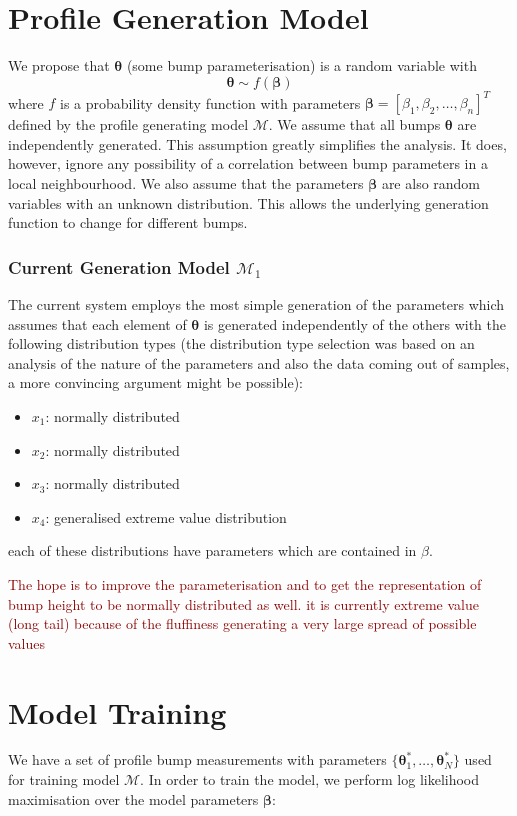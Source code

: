 \documentclass[12pt]{report}
\newcommand{\tcr}[1]{\textcolor{darkRed}{#1}}
\begin{document}
    \section{Profile Generation Model}
        We propose that $\pmb{\theta}$ (some bump parameterisation) is a random variable with
            \[ \pmb{\theta} \sim f(\pmb{\beta}) \]
        where $f$ is a probability density function with parameters $\pmb{\beta} = [\beta_1,\beta_2,\ldots,\beta_n]^T$ defined by the profile generating model $\mathcal{M}$.
        We assume that all bumps $\pmb{\theta}$ are independently generated. This assumption greatly simplifies the analysis. It does, however, ignore any possibility of a correlation between bump parameters in a local neighbourhood. We also assume that the parameters $\pmb{\beta}$ are also random variables with an unknown distribution. This allows the underlying generation function to change for different bumps.
        
        \subsubsection{Current Generation Model $\mathcal{M}_1$}
            The current system employs the most simple generation of the parameters which assumes that each element of $\pmb{\theta}$ is generated independently of the others with the following distribution types (the distribution type selection was based on an analysis of the nature of the parameters and also the data coming out of samples, a more convincing argument might be possible):
            \begin{itemize}
                \item $x_1$: normally distributed
                \item $x_2$: normally distributed
                \item $x_3$: normally distributed
                \item $x_4$: generalised extreme value distribution
            \end{itemize}
            each of these distributions have parameters which are contained in $\beta$.
            
            \tcr{The hope is to improve the parameterisation and to get the representation of bump height to be normally distributed as well. it is currently extreme value (long tail) because of the fluffiness generating a very large spread of possible values}
        
    \section{Model Training}
        We have a set of profile bump measurements with parameters $\{\pmb{\theta}^*_1,\ldots,\pmb{\theta}^*_N\}$ used for training model $\mathcal{M}$. In order to train the model, we perform log likelihood maximisation over the model parameters $\pmb{\beta}$:
        
\end{document}
